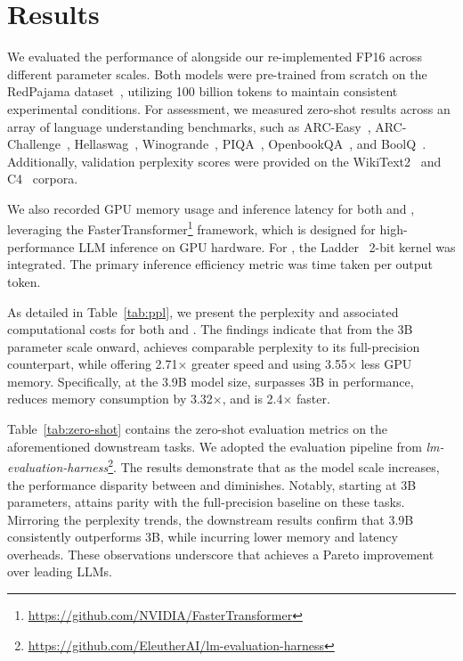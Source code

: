 \section{Results}

We evaluated the performance of  alongside our re-implemented FP16  across different parameter scales. Both models were pre-trained from scratch on the RedPajama dataset~\cite{redpajama}, utilizing 100 billion tokens to maintain consistent experimental conditions. For assessment, we measured zero-shot results across an array of language understanding benchmarks, such as ARC-Easy~\cite{arc}, ARC-Challenge~\cite{arc}, Hellaswag~\cite{hellaswag}, Winogrande~\cite{winoGrande}, PIQA~\cite{piqa}, OpenbookQA~\cite{openbookqa}, and BoolQ~\cite{boolq}. Additionally, validation perplexity scores were provided on the WikiText2~\cite{wikitext2} and C4~\cite{c4} corpora.

We also recorded GPU memory usage and inference latency for both  and , leveraging the FasterTransformer\footnote{\url{https://github.com/NVIDIA/FasterTransformer}} framework, which is designed for high-performance LLM inference on GPU hardware. For , the Ladder~\cite{ladder} 2-bit kernel was integrated. The primary inference efficiency metric was time taken per output token.

As detailed in Table~\ref{tab:ppl}, we present the perplexity and associated computational costs for both  and . The findings indicate that from the 3B parameter scale onward,  achieves comparable perplexity to its full-precision  counterpart, while offering 2.71$\times$ greater speed and using 3.55$\times$ less GPU memory. Specifically, at the 3.9B model size,  surpasses  3B in performance, reduces memory consumption by 3.32$\times$, and is 2.4$\times$ faster.

Table~\ref{tab:zero-shot} contains the zero-shot evaluation metrics on the aforementioned downstream tasks. We adopted the evaluation pipeline from \emph{lm-evaluation-harness}\footnote{\url{https://github.com/EleutherAI/lm-evaluation-harness}}. The results demonstrate that as the model scale increases, the performance disparity between  and  diminishes. Notably, starting at 3B parameters,  attains parity with the full-precision baseline on these tasks. Mirroring the perplexity trends, the downstream results confirm that  3.9B consistently outperforms  3B, while incurring lower memory and latency overheads. These observations underscore that  achieves a Pareto improvement over leading LLMs.

